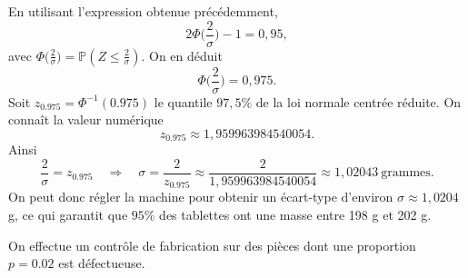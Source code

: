 \begin{questions}
\begin{parts}
\begin{solution}
En utilisant l'expression obtenue précédemment,
\[
2\Phi\!\Big(\frac{2}{\sigma}\Big)-1 = 0{,}95, 
\]
avec $\Phi\!\Big(\frac{2}{\sigma}\Big)=
\mathbb{P}\!\left(Z \le \frac{2}{\sigma}\right)$. On en déduit
\[
\Phi\!\Big(\frac{2}{\sigma}\Big) = 0{,}975.
\]
Soit $z_{0.975} = \Phi^{-1}(0.975)$ le quantile $97{,}5\%$ de la loi normale centrée réduite. On connaît la valeur numérique
\[
z_{0.975}\approx 1{,}959963984540054.
\]
Ainsi
\[
\frac{2}{\sigma} = z_{0.975}
\quad\Longrightarrow\quad
\sigma = \frac{2}{z_{0.975}} \approx \frac{2}{1{,}959963984540054}
\approx 1{,}02043\ \text{grammes}.
\]
On peut donc régler la machine pour obtenir un écart-type d'environ \(\sigma\approx 1{,}0204\) g, ce qui garantit que \(95\%\) des tablettes ont une masse entre 198 g et 202 g. \end{solution}

\end{parts}
\pageblanche
\question[]
On effectue un contrôle de fabrication sur des pièces dont une proportion $p=0.02$ est défectueuse. 

\end{questions}
